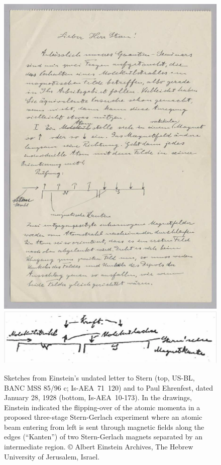 \documentclass[12pt]{article}
\begin{document}
\begin{figure}
\begin{center}
\includegraphics[scale=1.20]{figures/Einstein_sketch_color}
\includegraphics[scale=0.4]{figures/Einstein_sketch2}
\caption{Sketches from Einstein's undated letter to Stern (top, US-BL, BANC MSS 85/96 c; Is-AEA~71~120) and to Paul Ehrenfest, dated January 28, 1928 (bottom, Is-AEA~10-173). In the drawings, Einstein indicated the flipping-over of the atomic momenta in a proposed three-stage Stern-Gerlach experiment where an atomic beam entering from left is sent through magnetic fields along the edges (``Kanten'') of two Stern-Gerlach magnets separated by an intermediate region. \copyright{} Albert Einstein Archives, The Hebrew University of Jerusalem, Israel.}
\label{fig:Einstein_sketch}
\end{center}
\end{figure}
%
\end{document}
